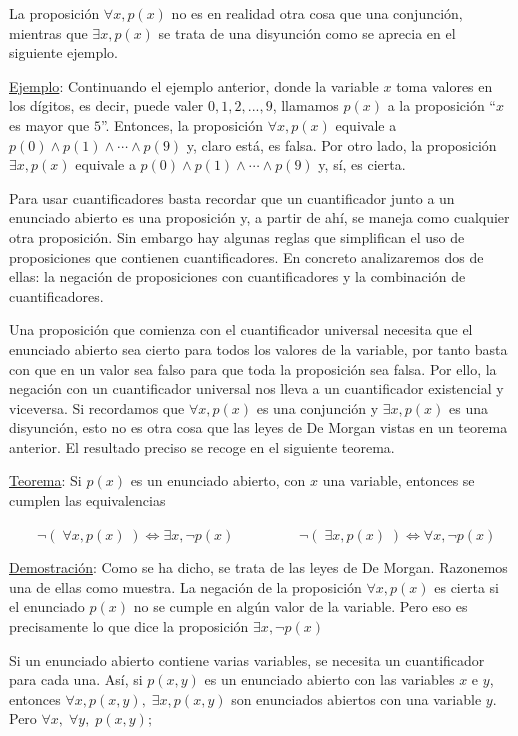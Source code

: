 La proposición $\forall x , p(x)$ no es en realidad otra cosa que una conjunción, mientras que $\exists x, p(x)$ se trata de una disyunción como se aprecia en el siguiente ejemplo.

\underline{Ejemplo}: Continuando el ejemplo anterior, donde la variable $x$ toma valores en los dígitos, es decir, puede valer $0, 1, 2, ..., 9$, llamamos $p(x)$ a la proposición “$x$ es mayor que $5$”. Entonces, la proposición $\forall x , p(x)$ equivale a $p(0) \wedge p(1) \wedge \cdots \wedge   p(9)$ y, claro está, es falsa. Por otro lado, la proposición $\exists x , p(x)$ equivale a $p(0) \wedge p(1) \wedge \cdots \wedge p(9)$ y, sí, es cierta.

Para usar cuantificadores basta recordar que un cuantificador junto a un enunciado abierto es una proposición y, a partir de ahí, se maneja como cualquier otra proposición. Sin embargo hay algunas reglas que simplifican el uso de proposiciones que contienen cuantificadores. En concreto analizaremos dos de ellas: la negación de proposiciones con cuantificadores y la combinación de cuantificadores.

Una proposición que comienza con el cuantificador universal necesita que el enunciado abierto sea cierto para todos los valores de la variable, por tanto basta con que en un valor sea falso para que toda la proposición sea falsa. Por ello, la negación con un cuantificador universal nos lleva a un cuantificador existencial y viceversa. Si recordamos que $\forall x , p(x)$ es una conjunción y $\exists x , p(x)$ es una disyunción, esto no es otra cosa que las leyes de De Morgan vistas en un teorema anterior. El resultado preciso se recoge en el siguiente teorema.

\underline{Teorema}: Si $p(x)$ es un enunciado abierto, con $x$ una variable, entonces se cumplen las equivalencias

$\qquad \neg (\;\forall x , p(x) \; ) \Leftrightarrow \exists x , \neg p(x)\; \qquad$
$\qquad \neg (\;\exists x , p(x) \; ) \Leftrightarrow \forall  x , \neg p(x)$


\underline{Demostración}: Como se ha dicho, se trata de las leyes de De Morgan. Razonemos una de ellas como muestra. La negación de la proposición $\forall x, p(x)$ es cierta si el enunciado $p(x)$ no se cumple en algún valor de la variable. Pero eso es precisamente lo que dice la proposición $\exists x, \neg p(x)$
\rightline{$\Box$}

Si un enunciado abierto contiene varias variables, se necesita un cuantificador para cada una. Así, si $p(x,y)$ es un enunciado abierto con las variables $x$ e $y$, entonces $ \forall x , p(x,y),\;  \exists x , p(x,y)$ son enunciados abiertos con una variable $y$. Pero $\forall x, \; \forall y, \; p(x,y); $

